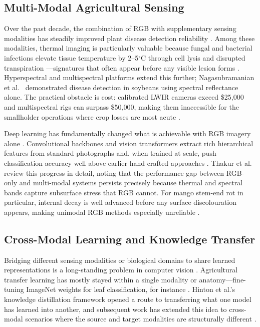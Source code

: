 \documentclass[utf8]{FrontiersinHarvard} %
\begin{document}
\subsection{Multi-Modal Agricultural Sensing}
Over the past decade, the combination of RGB with supplementary sensing modalities has steadily improved plant disease detection reliability \cite{maimaitijiang2020,lu2020}. Among these modalities, thermal imaging is particularly valuable because fungal and bacterial infections elevate tissue temperature by 2--5$^{\circ}$C through cell lysis and disrupted transpiration \cite{mahlein2016}---signatures that often appear before any visible lesion forms \cite{pineda2021}. Hyperspectral and multispectral platforms extend this further; Nagasubramanian et al.\ \cite{nagasubramanian2019} demonstrated disease detection in soybeans using spectral reflectance alone. The practical obstacle is cost: calibrated LWIR cameras exceed \$25{,}000 and multispectral rigs can surpass \$50{,}000, making them inaccessible for the smallholder operations where crop losses are most acute \cite{sishodia2020}.

Deep learning has fundamentally changed what is achievable with RGB imagery alone \cite{kamilaris2018,coulibaly2022}. Convolutional backbones and vision transformers extract rich hierarchical features from standard photographs and, when trained at scale, push classification accuracy well above earlier hand-crafted approaches \cite{dosovitskiy2021,liu2022convnext}. Thakur et al.\ \cite{thakur2022} review this progress in detail, noting that the performance gap between RGB-only and multi-modal systems persists precisely because thermal and spectral bands capture subsurface stress that RGB cannot. For mango stem-end rot in particular, internal decay is well advanced before any surface discolouration appears, making unimodal RGB methods especially unreliable \cite{lu2020,pineda2021}.

\subsection{Cross-Modal Learning and Knowledge Transfer}
Bridging different sensing modalities or biological domains to share learned representations is a long-standing problem in computer vision \cite{zhuang2020}. Agricultural transfer learning has mostly stayed within a single modality or anatomy---fine-tuning ImageNet weights for leaf classification, for instance \cite{chen2020_transfer,tan2018,barbedo2019}. Hinton et al.'s knowledge distillation framework \cite{hinton2015} opened a route to transferring what one model has learned into another, and subsequent work has extended this idea to cross-modal scenarios where the source and target modalities are structurally different \cite{li2023_kd}.
\end{document}
